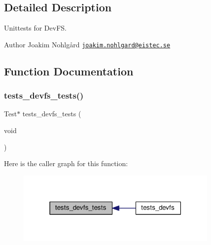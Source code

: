 \subsection{Detailed Description}
Unittests for Dev\+FS. 

\begin{DoxyAuthor}{Author}
Joakim Nohlgård \href{mailto:joakim.nohlgard@eistec.se}{\tt joakim.\+nohlgard@eistec.\+se} 
\end{DoxyAuthor}


\subsection{Function Documentation}
\mbox{\label{tests-devfs_8c_a7b30a55f708f40675620d1301491bc01}} 
\subsubsection{\texorpdfstring{tests\+\_\+devfs\+\_\+tests()}{tests\_devfs\_tests()}}
{\footnotesize\ttfamily Test$\ast$ tests\+\_\+devfs\+\_\+tests (\begin{DoxyParamCaption}\item[{void}]{ }\end{DoxyParamCaption})}

Here is the caller graph for this function\+:
\nopagebreak
\begin{figure}[H]
\begin{center}
\leavevmode
\includegraphics[width=279pt]{tests-devfs_8c_a7b30a55f708f40675620d1301491bc01_icgraph}
\end{center}
\end{figure}

